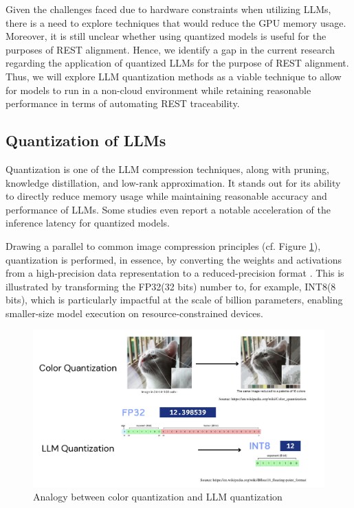 \documentclass[conference]{IEEEtran}
\begin{document}
Given the challenges faced due to hardware constraints when utilizing LLMs, there is a need to explore techniques that would reduce the GPU memory usage. Moreover, it is still unclear whether using quantized models is useful for the purposes of REST alignment. Hence, we identify a gap in the current research regarding the application of quantized LLMs for the purpose of REST alignment. Thus, we will explore LLM quantization methods as a viable technique to allow for models to run in a non-cloud environment while retaining reasonable performance in terms of automating REST traceability.

\subsection{Quantization of LLMs}

Quantization is one of the LLM compression techniques, along with pruning, knowledge distillation, and low-rank approximation\cite{bai2024beyond}. It stands out for its ability to directly reduce memory usage while maintaining reasonable accuracy and performance of LLMs. Some studies even report a notable acceleration of the inference latency for quantized models\cite{shen2024exploring}.

Drawing a parallel to common image compression principles (cf. Figure \ref{fig:quantvisual}), quantization is performed, in essence, by converting the weights and activations from a high-precision data representation to a reduced-precision format \cite{zhao2025benchmarking, bai2024beyond}. This is illustrated by transforming the FP32(32 bits) number to, for example, INT8(8 bits), which is particularly impactful at the scale of billion parameters, enabling smaller-size model execution on resource-constrained devices.

\begin{figure}[ht]
    \includegraphics[width=\columnwidth]{img}
    \caption{Analogy between color quantization and LLM quantization}
    \label{fig:quantvisual}
\end{figure}
\end{document}
